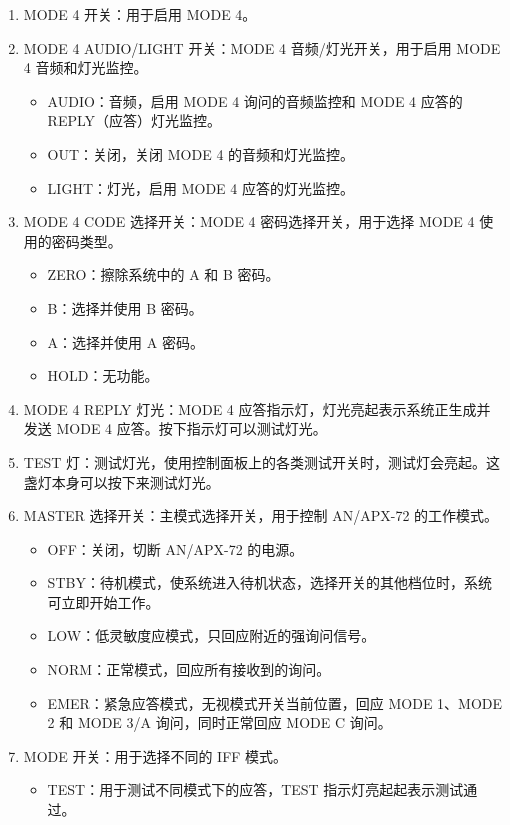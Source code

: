 \begin{enumerate}
	\item MODE 4 开关：用于启用 MODE 4。
	\item MODE 4 AUDIO/LIGHT 开关：MODE 4 音频/灯光开关，用于启用 MODE 4 音频和灯光监控。
	      \begin{itemize}
		      \item AUDIO：音频，启用 MODE 4 询问的音频监控和 MODE 4 应答的 REPLY（应答）灯光监控。
		      \item OUT：关闭，关闭 MODE 4 的音频和灯光监控。
		      \item LIGHT：灯光，启用 MODE 4 应答的灯光监控。
	      \end{itemize}
	\item MODE 4 CODE 选择开关：MODE 4 密码选择开关，用于选择 MODE 4 使用的密码类型。
	      \begin{itemize}
		      \item ZERO：擦除系统中的 A 和 B 密码。
		      \item B：选择并使用 B 密码。
		      \item A：选择并使用 A 密码。
		      \item HOLD：无功能。
	      \end{itemize}
	\item MODE 4 REPLY 灯光：MODE 4 应答指示灯，灯光亮起表示系统正生成并发送 MODE 4 应答。按下指示灯可以测试灯光。
	\item TEST 灯：测试灯光，使用控制面板上的各类测试开关时，测试灯会亮起。这盏灯本身可以按下来测试灯光。
	\item MASTER 选择开关：主模式选择开关，用于控制 AN/APX-72 的工作模式。
	      \begin{itemize}
		      \item OFF：关闭，切断 AN/APX-72 的电源。
		      \item STBY：待机模式，使系统进入待机状态，选择开关的其他档位时，系统可立即开始工作。
		      \item LOW：低灵敏度应模式，只回应附近的强询问信号。
		      \item NORM：正常模式，回应所有接收到的询问。
		      \item EMER：紧急应答模式，无视模式开关当前位置，回应 MODE 1、MODE 2 和 MODE 3/A 询问，同时正常回应 MODE C 询问。
	      \end{itemize}
	\item MODE 开关：用于选择不同的 IFF 模式。
	      \begin{itemize}
		      \item TEST：用于测试不同模式下的应答，TEST 指示灯亮起起表示测试通过。

\end{itemize}
\end{enumerate}
